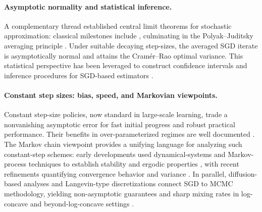 \paragraph{Asymptotic normality and statistical inference.}
A complementary thread established central limit theorems for stochastic approximation: classical milestones include \citet{chung1954stochastic,sacks1958asymptotic,fabian1968asymptotic,ruppert1988efficient,shapiro1989asymptotic}, culminating in the Polyak--Juditsky averaging principle \citep{polyak1992acceleration}. Under suitable decaying step-sizes, the averaged SGD iterate is asymptotically normal and attains the Cramér--Rao optimal variance. This statistical perspective has been leveraged to construct confidence intervals and inference procedures for SGD-based estimators \citep{tripuraneni2018averaging,su2018statistical,toulis2017asymptotic,fang2018online}.

\paragraph{Constant step sizes: bias, speed, and Markovian viewpoints.}
Constant step-size policies, now standard in large-scale learning, trade a nonvanishing asymptotic error for fast initial progress and robust practical performance. Their benefits in over-parameterized regimes are well documented \citep{schmidt2013fast,needell2014stochastic,ma2018power,vaswani2019fast}. The Markov chain viewpoint provides a unifying language for analyzing such constant-step schemes: early developments used dynamical-systems and Markov-process techniques to establish stability and ergodic properties \citep{kifer1988random,benaim1996dynamical,priouret1998remark,fort1999asymptotic,aguech2000perturbation}, with recent refinements quantifying convergence behavior and variance \citep{dieuleveut2020bridging,chee2018convergence,tan2023online}. In parallel, diffusion-based analyses and Langevin-type discretizations connect SGD to MCMC methodology, yielding non-asymptotic guarantees and sharp mixing rates in log-concave and beyond-log-concave settings \citep{dalalyan2017theoretical,durmus2017nonasymptotic,cheng2018underdamped,dalalyan2019user,brosse2017sampling,cheng2018sharp,bubeck2018sampling,dwivedi2019log,dalalyan2020sampling,li2019stochastic,shen2019randomized,erdogdu2021convergence}.

